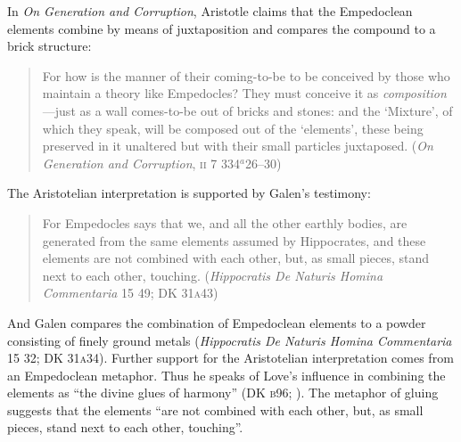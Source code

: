 In \emph{On Generation and Corruption}, Aristotle claims that the Empedoclean elements combine by means of juxtaposition and compares the compound to a brick structure:
\begin{quote}
    For how is the manner of their coming-to-be to be conceived by those who maintain a theory like Empedocles? They must conceive it as \emph{composition}---just as a wall comes-to-be out of bricks and stones: and the `Mixture', of which they speak, will be composed out of the `elements', these being preserved in it unaltered but with their small particles juxtaposed. (\emph{On Generation and Corruption}, \textsc{ii} 7 334\( ^{a} \)26--30)
\end{quote}
The Aristotelian interpretation is supported by Galen's testimony:
\begin{quote}
     For Empedocles says that we, and all the other earthly bodies, are generated from the same elements assumed by Hippocrates, and these elements are not combined with each other, but, as small pieces, stand next to each other, touching. (\emph{Hippocratis De Naturis Homina Commentaria} 15 49; DK 31\textsc{a}43)
\end{quote}
And Galen compares the combination of Empedoclean elements to a powder consisting of finely ground metals (\emph{Hippocratis De Naturis Homina Commentaria} 15 32; DK 31\textsc{a}34). Further support for the Aristotelian interpretation comes from an Empedoclean metaphor. Thus he speaks of Love's influence in combining the elements as ``the divine glues of harmony'' (DK \textsc{b}96; \citealt[62 245]{Inwood:2001ve}). The metaphor of gluing suggests that the elements ``are not combined with each other, but, as small pieces, stand next to each other, touching''.

